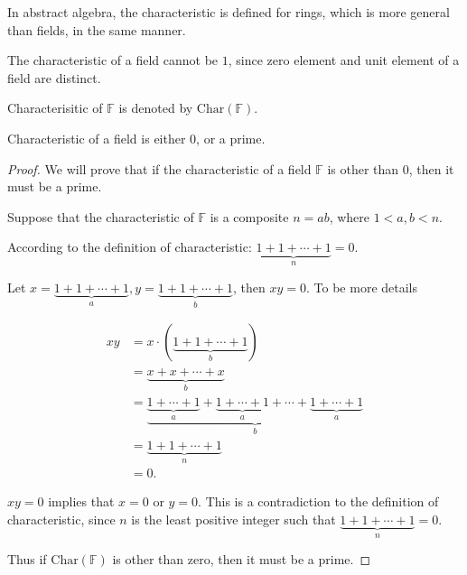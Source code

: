 \begin{note}
	In abstract algebra, the characteristic is defined for rings, which is more general than fields, in the same manner.

	The characteristic of a field cannot be $1$, since zero element and unit element of a field are distinct.

	Characterisitic of $\mathbb{F}$ is denoted by $\text{Char}(\mathbb{F})$.
\end{note}

\begin{theorem}
	Characteristic of a field is either $0$, or a prime.
\end{theorem}

\begin{proof}
	We will prove that if the characteristic of a field $\mathbb{F}$ is other than $0$, then it must be a prime.

	Suppose that the characteristic of $\mathbb{F}$ is a composite $n = ab$, where $1 < a, b < n$.

	According to the definition of characteristic: $\underbrace{1 + 1 + \cdots + 1}_{n} = 0$.

	Let $x = \underbrace{1 + 1 + \cdots + 1}_{a}, y = \underbrace{1 + 1 + \cdots + 1}_{b}$, then $xy = 0$. To be more details

	\begin{align*}
		xy & = x\cdot (\underbrace{1 + 1 + \cdots + 1}_{b})                                                                                  \\
		   & = \underbrace{x + x + \cdots + x}_{b}                                                                                           \\
		   & = \underbrace{\underbrace{1 + \cdots + 1}_{a} + \underbrace{1 + \cdots + 1}_{a} + \cdots + \underbrace{1 + \cdots + 1}_{a}}_{b} \\
		   & = \underbrace{1 + 1 + \cdots + 1}_{n}                                                                                           \\
		   & = 0.
	\end{align*}

	$xy = 0$ implies that $x = 0$ or $y = 0$. This is a contradiction to the definition of characteristic, since $n$ is the least positive integer such that $\underbrace{1 + 1 + \cdots + 1}_{n} = 0$.

	Thus if $\text{Char}(\mathbb{F})$ is other than zero, then it must be a prime.
\end{proof}

